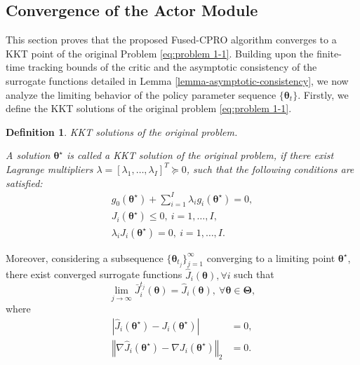 \documentclass{IEEEtran}
\newtheorem{definition}{Definition}
\begin{document}
\subsection{Convergence of the Actor Module}
This section proves that the proposed Fused-CPRO algorithm converges to a KKT point of the original Problem \eqref{eq:problem 1-1}. Building upon the finite-time tracking bounds of the critic and the asymptotic consistency of the surrogate functions detailed in Lemma \ref{lemma-asymptotic-consistency}, we now analyze the limiting behavior of the policy parameter sequence $\{\boldsymbol{\theta}_{t}\}$. Firstly, we define the KKT solutions of the original problem \eqref{eq:problem 1-1}.

\begin{definition}
KKT solutions of the original problem.

A solution $\boldsymbol{\theta}^{\star}$ is called a KKT solution of the original problem, if there exist Lagrange multipliers $\lambda=\left[\lambda_{1},\ldots,\lambda_{I}\right]^{T}\succeq0$, such that the following conditions are satisfied:
\begin{gather}
g_{0}\!\left(\boldsymbol{\theta}^{\star}\right)+\sum_{i=1}^{I}\lambda_{i}g_{i}\!\left(\boldsymbol{\theta}^{\star}\right)=0,\label{eq:KKT_stationarity}\\
J_{i}\!\left(\boldsymbol{\theta}^{\star}\right)\leq0,\ i=1,\ldots,I,\label{eq:KKT_primal_feasibility}\\
\lambda_{i}J_{i}\!\left(\boldsymbol{\theta}^{\star}\right)=0,\ i=1,\ldots,I.\label{eq:KKT_complementary_slackness}
\end{gather}

\end{definition}
Moreover, considering a subsequence $\{\boldsymbol{\theta}_{t_{j}}\}_{j=1}^{\infty}$ converging to a limiting point $\boldsymbol{\theta}^{\star}$, there exist converged surrogate functions $\hat{J}_{i}(\boldsymbol{\theta}),\forall i$ such that
\begin{equation}
\lim_{j\rightarrow\infty}\bar{J}_{i}^{t_{j}}(\boldsymbol{\theta})=\hat{J}_{i}(\boldsymbol{\theta}),\ \forall\boldsymbol{\theta}\in\boldsymbol{\Theta},\label{eq:surrogate_limit_function}
\end{equation}
where
\begin{align}
\left|\hat{J}_{i}\!\left(\boldsymbol{\theta}^{\star}\right)-J_{i}\!\left(\boldsymbol{\theta}^{\star}\right)\right|&=0,\label{eq:surrogate_limit_value}\\
\left\Vert \nabla\hat{J}_{i}\!\left(\boldsymbol{\theta}^{\star}\right)-\nabla J_{i}\!\left(\boldsymbol{\theta}^{\star}\right)\right\Vert _{2}&=0.\label{eq:surrogate_limit_gradient}
\end{align}
\end{document}
